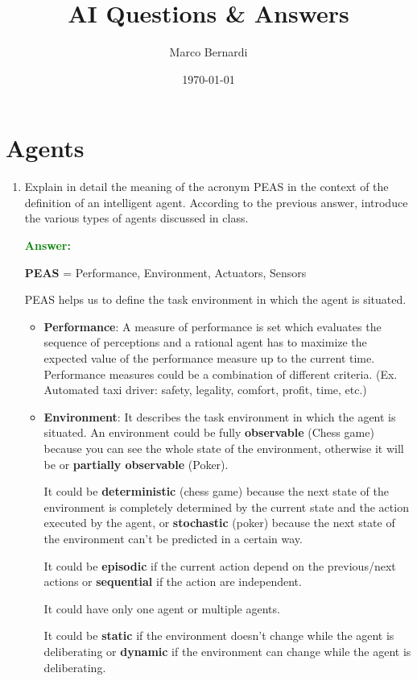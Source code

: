 \documentclass[12pt]{article}
\title{AI Questions \& Answers}
\author{Marco Bernardi}
\date{\today}
\begin{document}
\maketitle
\section{Agents}
\begin{enumerate}[label=\textbf{A.\arabic*}]
    \item Explain in detail the meaning of the acronym PEAS in the context of the definition of an intelligent agent. 
    According to the previous answer, introduce the various types of agents discussed in class.
    
    \textcolor{green}{\textbf{Answer:}}
    
    \textbf{PEAS} = Performance, Environment, Actuators, Sensors

    PEAS helps us to define the task environment in which the agent is situated.
    \begin{itemize}
        \item \textbf{Performance}: A measure of performance is set which evaluates the sequence of perceptions 
        and a rational agent has to maximize the expected value of the performance measure up to the current time.
        Performance measures could be a combination of different criteria. (Ex. Automated taxi driver: safety, legality, comfort, profit, time, etc.) 
        \item \textbf{Environment}: It describes the task environment in which the agent is situated.
        An environment could be fully \textbf{observable} (Chess game) because you can see the whole state of the environment, otherwise it will be 
        or \textbf{partially observable} (Poker).

        It could be \textbf{deterministic} (chess game) because the next state of the environment is completely determined 
        by the current state and the action executed by the agent,
        or \textbf{stochastic} (poker) because the next state of the environment can't be predicted in a certain way.

        It could be \textbf{episodic} if the current action depend on the previous/next actions or \textbf{sequential} if the action are independent.
        
        It could have only one agent or multiple agents.

        It could be \textbf{static} if the environment doesn't change while the agent is deliberating or \textbf{dynamic} if the environment can change while the agent is deliberating.


\end{itemize}
\end{enumerate}
\end{document}
